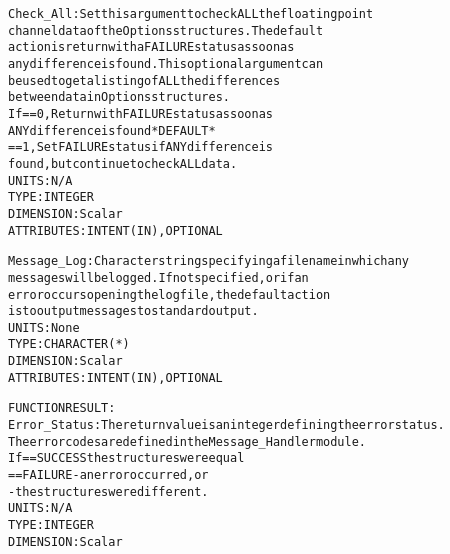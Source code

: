 \begin{alltt}
        Check_All:          Set this argument to check ALL the floating point
                            channel data of the Options structures. The default
                            action is return with a FAILURE status as soon as
                            any difference is found. This optional argument can
                            be used to get a listing of ALL the differences
                            between data in Options structures.
                            If == 0, Return with FAILURE status as soon as
                                     ANY difference is found  *DEFAULT*
                               == 1, Set FAILURE status if ANY difference is
                                     found, but continue to check ALL data.
                            UNITS:      N/A
                            TYPE:       INTEGER
                            DIMENSION:  Scalar
                            ATTRIBUTES: INTENT(IN), OPTIONAL
 
        Message_Log:        Character string specifying a filename in which any
                            messages will be logged. If not specified, or if an
                            error occurs opening the log file, the default action
                            is to output messages to standard output.
                            UNITS:      None
                            TYPE:       CHARACTER(*)
                            DIMENSION:  Scalar
                            ATTRIBUTES: INTENT(IN), OPTIONAL
 
  FUNCTION RESULT:
        Error_Status:       The return value is an integer defining the error status.
                            The error codes are defined in the Message_Handler module.
                            If == SUCCESS the structures were equal
                               == FAILURE - an error occurred, or
                                          - the structures were different.
                            UNITS:      N/A
                            TYPE:       INTEGER
                            DIMENSION:  Scalar
 
  \end{alltt}
